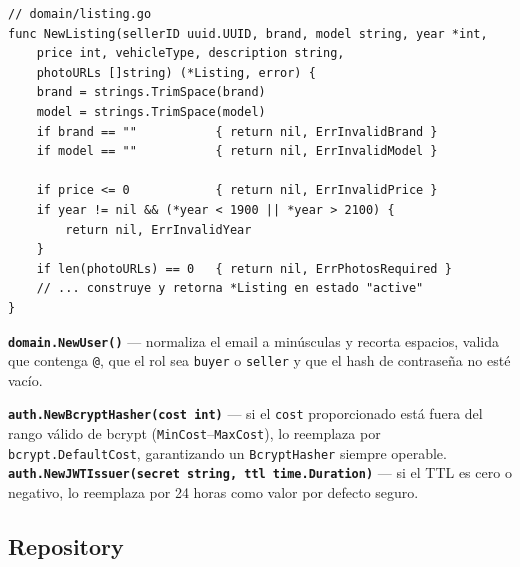 \documentclass[12pt,a4paper]{article}
\begin{document}
\begin{lstlisting}[style=gostyle]
// domain/listing.go
func NewListing(sellerID uuid.UUID, brand, model string, year *int,
    price int, vehicleType, description string,
    photoURLs []string) (*Listing, error) {
    brand = strings.TrimSpace(brand)
    model = strings.TrimSpace(model)
    if brand == ""           { return nil, ErrInvalidBrand }
    if model == ""           { return nil, ErrInvalidModel }
 
    if price <= 0            { return nil, ErrInvalidPrice }
    if year != nil && (*year < 1900 || *year > 2100) {
        return nil, ErrInvalidYear
    }
    if len(photoURLs) == 0   { return nil, ErrPhotosRequired }
    // ... construye y retorna *Listing en estado "active"
}
\end{lstlisting}

\textbf{\texttt{domain.NewUser()}} --- normaliza el email a minúsculas y recorta espacios,
valida que contenga \texttt{@}, que el rol sea \texttt{buyer} o \texttt{seller} y que el hash de
contraseña no esté vacío.

\textbf{\texttt{auth.NewBcryptHasher(cost int)}} --- si el \texttt{cost} proporcionado está
fuera del rango válido de bcrypt (\texttt{MinCost}--\texttt{MaxCost}), lo reemplaza por
\texttt{bcrypt.DefaultCost}, garantizando un \texttt{BcryptHasher} siempre operable.
\textbf{\texttt{auth.NewJWTIssuer(secret string, ttl time.Duration)}} --- si el TTL es cero o
negativo, lo reemplaza por 24 horas como valor por defecto seguro.
\begin{center}
\end{center}

\subsection{Repository}
\end{document}
